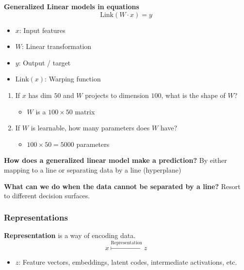 \documentclass{article}
\begin{document}
\begin{definition} \textbf{Generalized Linear models in equations}
    \begin{equation}
        \text{Link}(W \cdot x) = y
    \end{equation}
    \begin{itemize}
        \item $x$: Input features
        \item $W$: Linear transformation
        \item $y$: Output / target
        \item $\text{Link}(x)$: Warping function
    \end{itemize}
\end{definition}

\begin{example}
    \begin{enumerate}
        \item If $x$ has dim $50$ and $W$ projects to dimension $100$, what is the shape of $W$?
        \begin{itemize}
            \item $W$ is a $100 \times 50$ matrix
        \end{itemize}
        \item If $W$ is learnable, how many parameters does $W$ have?
        \begin{itemize}
            \item $100 \times 50 = 5000$ parameters
        \end{itemize}
    \end{enumerate}
\end{example}

\begin{notes} \textbf{How does a generalized linear model make a prediction?}
    By either mapping to a line or separating data by a line (hyperplane)
\end{notes}

\begin{notes} \textbf{What can we do when the data cannot be separated by a line?}
    Resort to different decision surfaces.
\end{notes}

\subsubsection{Representations}
\begin{definition}
    \textbf{Representation} is a way of encoding data.
    \begin{equation}
        x \overset{\text{Representation}}{\mapsto} z
    \end{equation}
    \begin{itemize}
        \item $z$: Feature vectors, embeddings, latent codes, intermediate activations, etc.
    \end{itemize}
\end{definition}
\begin{notes}
\end{notes}
\end{document}

